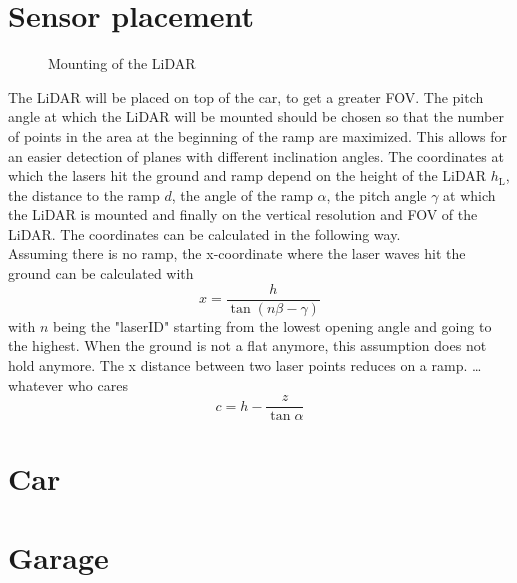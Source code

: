 \section{Sensor placement}
\begin{figure}[htpb]
	\centering
	
	\caption{Mounting of the LiDAR}
	\label{fig:tikz_lidar_mount}
\end{figure}
The LiDAR will be placed on top of the car, to get a greater FOV.
The pitch angle at which the LiDAR will be mounted should be chosen so that the number of points in the area at the beginning of the ramp are maximized.
This allows for an easier detection of planes with different inclination angles.
The coordinates at which the lasers hit the ground and ramp depend on the height of the LiDAR $ h_\mathrm{L} $, the distance to the ramp $d$, the angle of the ramp $\alpha$, the pitch angle $\gamma$ at which the LiDAR is mounted and finally on the vertical resolution and FOV of the LiDAR. The coordinates can be calculated in the following way.\\
Assuming there is no ramp, the x-coordinate where the laser waves hit the ground can be calculated with
\begin{equation}
	x = \frac{h}{\tan(n\beta - \gamma)}
\end{equation}
with $n$ being the "laserID" starting from the lowest opening angle and going to the highest.
When the ground is not a flat anymore, this assumption does not hold anymore. The x distance between two laser points reduces on a ramp.
\dots whatever who cares
\[ c = h - \frac{z}{\tan \alpha} \]



\section{Car}



\section{Garage}
